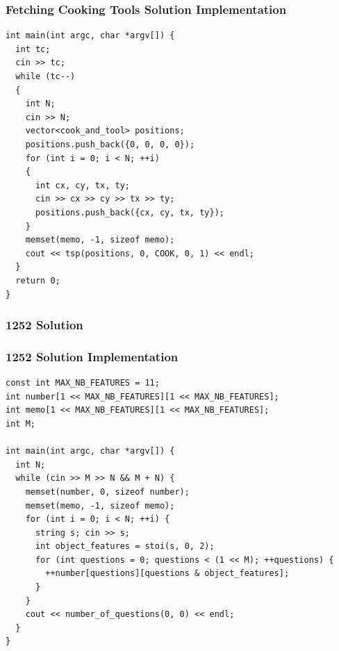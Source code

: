 \documentclass{beamer}
\newcommand{\uvalink}[2]{UVa Online Judge (http://uva.onlinejudge.org)
  problem number \href{#2}{\textcolor{blue}{#1}.}}
\newcounter{exo}
\newcommand{\exo}{
  \addtocounter{exo}{1}
  Exercice \arabic{exo}
}
\begin{document}
\begin{frame}[containsverbatim]
\frametitle{Fetching Cooking Tools Solution Implementation}

\scriptsize
\begin{lstlisting}
int main(int argc, char *argv[]) {
  int tc;
  cin >> tc;
  while (tc--)
  {
    int N;
    cin >> N;
    vector<cook_and_tool> positions;
    positions.push_back({0, 0, 0, 0});
    for (int i = 0; i < N; ++i)
    {
      int cx, cy, tx, ty;
      cin >> cx >> cy >> tx >> ty;
      positions.push_back({cx, cy, tx, ty});
    }
    memset(memo, -1, sizeof memo);
    cout << tsp(positions, 0, COOK, 0, 1) << endl;
  }
  return 0;
}
\end{lstlisting}

\end{frame}

\fi


\ifanswers

\begin{frame}%
\frametitle{1252 Solution}

\end{frame}

\begin{frame}[fragile]
\frametitle{1252 Solution Implementation}

\scriptsize
\begin{lstlisting}
const int MAX_NB_FEATURES = 11;
int number[1 << MAX_NB_FEATURES][1 << MAX_NB_FEATURES];
int memo[1 << MAX_NB_FEATURES][1 << MAX_NB_FEATURES];
int M;

int main(int argc, char *argv[]) {
  int N;
  while (cin >> M >> N && M + N) {
    memset(number, 0, sizeof number);
    memset(memo, -1, sizeof memo);
    for (int i = 0; i < N; ++i) {
      string s;	cin >> s;
      int object_features = stoi(s, 0, 2);
      for (int questions = 0; questions < (1 << M); ++questions) {
        ++number[questions][questions & object_features];
      }
    }
    cout << number_of_questions(0, 0) << endl;
  }
}
\end{lstlisting}

\end{frame}
\end{document}
